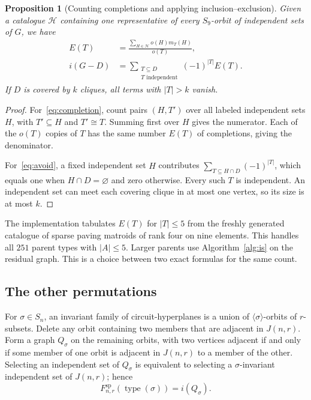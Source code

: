 \documentclass[11pt]{article}
\newtheorem{proposition}[theorem]{Proposition}
\theoremstyle{definition}
\DeclareMathOperator{\type}{type}
\newcommand{\SP}{\mathrm{sp}}
\begin{document}
\begin{proposition}[Counting completions and applying inclusion--exclusion]\label{prop:completion}
Given a catalogue $\mathcal H$ containing one representative of every $S_9$-orbit of independent sets of
$G$, we have
\begin{align}
E(T)&=\frac{\sum_{H\in\mathcal H}o(H)m_T(H)}{o(T)},
\label{eq:completion}\\
i(G-D)&=\sum_{\substack{T\subseteq D\\T\text{ independent}}}
                  (-1)^{|T|}E(T).
\label{eq:avoid}
\end{align}
If $D$ is covered by $k$ cliques, all terms with $|T|>k$ vanish.
\end{proposition}
\begin{proof}
For~\eqref{eq:completion}, count pairs $(H,T')$ over all labeled independent
sets $H$, with $T'\subseteq H$ and $T'\cong T$. Summing first over $H$
gives the numerator. Each of the $o(T)$ copies of $T$ has the same number
$E(T)$ of completions, giving the denominator.

For~\eqref{eq:avoid}, a fixed independent set $H$ contributes
$\sum_{T\subseteq H\cap D}(-1)^{|T|}$, which equals one when
$H\cap D=\varnothing$ and zero otherwise. Every such $T$ is independent.
An independent set can meet each covering clique in at most one vertex,
so its size is at most $k$.
\end{proof}

The implementation tabulates $E(T)$ for $|T|\le5$ from the freshly generated
catalogue of sparse paving matroids of rank four on nine elements. This handles all $251$ parent types
with $|A|\le5$. Larger parents use Algorithm~\ref{alg:is} on the residual
graph. This is a choice between two exact formulas for the same count.

\subsection{The other permutations}

For $\sigma\in S_n$, an invariant family of circuit-hyperplanes is a union of
$\langle\sigma\rangle$-orbits of $r$-subsets. Delete any orbit containing
two members that are adjacent in $J(n,r)$. Form a graph $Q_\sigma$ on the
remaining orbits, with two vertices adjacent if and only if some member
of one orbit is adjacent in $J(n,r)$ to a member of the other.
Selecting an independent set of $Q_\sigma$ is equivalent to selecting a $\sigma$-invariant independent
set of $J(n,r)$; hence
\begin{equation}\label{eq:sp-fixed}
F^{\SP}_{n,r}(\type(\sigma))=i(Q_\sigma).
\end{equation}
\end{document}

